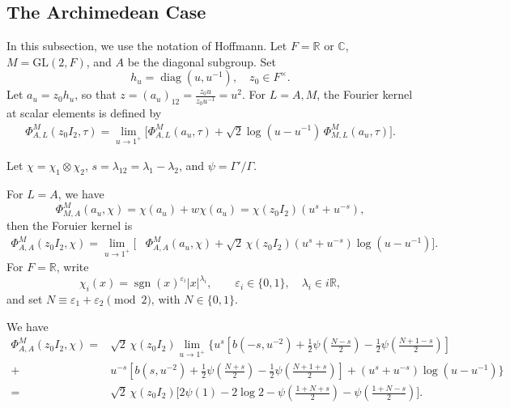 \documentclass[11pt]{amsart}
\theoremstyle{definition}
\numberwithin{equation}{section}
\begin{document}
	\subsection{The Archimedean Case}
	In this subsection, we use the notation of Hoffmann. Let \(F = \mathbb{R}\) or \(\mathbb{C}\), \(M = \mathrm{GL}(2,F)\), and \(A\) be the diagonal subgroup. Set
	\[
	h_u = \operatorname{diag}(u, u^{-1}), \quad z_0 \in F^\times.
	\]
	Let \(a_u = z_0 h_u\), so that \(z = (a_u)_{12} =\frac{z_0u}{z_0u^{-1}}= u^2\). For \(L = A, M\), the Fourier kernel at scalar elements is defined by
	\begin{equation*}
		\begin{aligned}
			\Phi^M_{A,L}(z_0 I_2, \tau) 
			= \lim_{u \to 1^+} \Big[ 
			\Phi^M_{A,L}(a_u, \tau)+\sqrt{2}\log(u - u^{-1}) \, \Phi^M_{M,L}(a_u, \tau) 
			\Big].
		\end{aligned}
	\end{equation*}
	
	Let \(\chi = \chi_1 \otimes \chi_2\), \(s = \lambda_{12} = \lambda_1 - \lambda_2\), and \(\psi = \Gamma'/\Gamma\). 
	
	For \(L=A\), we have \[\Phi^M_{M,A}(a_u, \chi) = \chi(a_u) + w\chi(a_u) = \chi(z_0 I_2)(u^s + u^{-s}),\]
	then the Foruier kernel is
	\begin{equation*}
		\begin{aligned}
			\Phi^M_{A,A}(z_0I_2,\chi)
			=\lim_{u\to1^+}\Big[&\Phi^M_{A,A}(a_u,\chi)+\sqrt2\,\chi(z_0 I_2)(u^s+u^{-s})\log(u-u^{-1})\Big].
		\end{aligned}
	\end{equation*}
	For \(F = \mathbb{R}\), write
	\[
	\chi_i(x) = \operatorname{sgn}(x)^{\varepsilon_i} |x|^{\lambda_i},
	\qquad \varepsilon_i \in \{0, 1\}, \quad \lambda_i \in i\mathbb{R},
	\]
	and set \(N \equiv \varepsilon_1 + \varepsilon_2 \pmod 2\), with \(N \in \{0, 1\}\). 
	
	We have
	\begin{equation*}
		\begin{aligned}
			\Phi^M_{A,A}(z_0I_2,\chi)
			=&\sqrt2\, \chi(z_0 I_2)\lim_{u\to1^+}\Bigg\{u^s\left[
			b(-s,u^{-2})
			+\frac12\psi\!\left(\frac{N-s}{2}\right)
			-\frac12\psi\!\left(\frac{N+1-s}{2}\right)\right]\\
			+&u^{-s}\left[
			b(s,u^{-2})
			+\frac12\psi\!\left(\frac{N+s}{2}\right)
			-\frac12\psi\!\left(\frac{N+1+s}{2}\right)\right]+(u^s+u^{-s})\log(u-u^{-1})\Bigg\}\\
			=&\sqrt{2}\, \chi(z_0 I_2) \Bigg[ 
			2\psi(1) - 2\log 2 -\psi\!\left(\frac{1 + N + s}{2}\right)-\psi\!\left(\frac{1 + N - s}{2}\right) 
			\Bigg].
		\end{aligned}
	\end{equation*}
	
\end{document}
